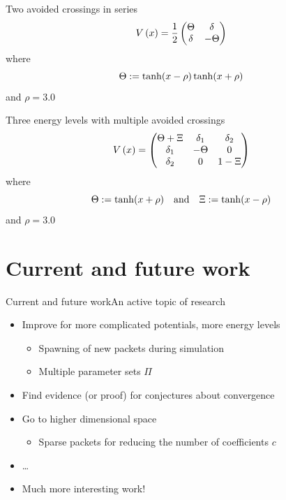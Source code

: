 \documentclass{beamer}
\begin{document}
\begin{frame}{Two avoided crossings in series}
  \begin{equation*}
    V\left( x \right) =
    \frac{1}{2}
    \begin{pmatrix}
      \Theta & \delta \\
      \delta & -\Theta
    \end{pmatrix}
  \end{equation*}
  where
  \begin{equation*}
    \Theta := \tanh(x-\rho) \tanh(x+\rho)
  \end{equation*}
  and $\rho = 3.0$
\end{frame}


\begin{frame}{Three energy levels with multiple avoided crossings}
  \begin{equation*}
    V\left( x \right) = \begin{pmatrix}
      \Theta + \Xi & \delta_1 & \delta_2 \\
      \delta_1     & -\Theta  & 0 \\
      \delta_2     & 0        & 1 - \Xi
    \end{pmatrix}
  \end{equation*}
  where
  \begin{equation*}
    \Theta := \tanh(x + \rho) \quad \text{and} \quad
    \Xi := \tanh(x-\rho)
  \end{equation*}
  and $\rho = 3.0$
\end{frame}


\section{Current and future work}


\begin{frame}{Current and future work}{An active topic of research}
  \begin{itemize}
  \item Improve for more complicated potentials, more energy levels
    \begin{itemize}
    \item Spawning of new packets during simulation
    \item Multiple parameter sets $\Pi$
    \end{itemize}
  \item Find evidence (or proof) for conjectures about convergence
  \item Go to higher dimensional space
    \begin{itemize}
    \item Sparse packets for reducing the number of coefficients $c$
    \end{itemize}
  \item \ldots
  \item Much more interesting work!
  \end{itemize}
\end{frame}
\end{document}
